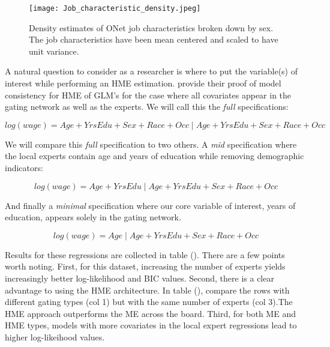 \documentclass[12pt]{article}
\begin{document}
\begin{figure}[ht]
  \texttt{[image: Job\_characteristic\_density.jpeg]}
  \caption{Density estimates of ONet job characteristics broken down by
  sex. The job characteristics have been mean centered and scaled to
  have unit variance.}
  \label{fig:JobChar_vs_sex}
\end{figure}

A natural question to consider as a researcher is where to put the variable(s)
of interest while performing an HME estimation. \cite{JiangTanner2000}
provide their proof of model consistency for HME of GLM's for the case where
all covariates appear in the gating network as well as the experts. We will
call this the \textit{full} specifications:

\begin{equation}
  log(wage) = Age + YrsEdu + Sex +  Race + Occ \; | \; Age + YrsEdu + Sex +  Race + Occ
\end{equation}

We will compare this \textit{full} specification to two others. A
\textit{mid} specification where the local experts contain age and
years of education while removing demographic indicators:

\begin{equation}
  log(wage) = Age + YrsEdu \; | \; Age + YrsEdu + Sex +  Race + Occ
\end{equation}

And finally a \textit{minimal} specification where our core variable
of interest, years of education, appears solely in the gating network.

\begin{equation}
  log(wage) = Age \; | \; Age + YrsEdu + Sex +  Race + Occ
\end{equation}

Results for these regressions are collected in table ().
There are a few points worth noting. First, for this dataset, increasing the
number of experts yields increasingly better log-likelihood and BIC values.
Second, there is a clear advantage to using the HME architecture. In table (), compare the rows with different gating types (col 1)
but with the same number of experts (col 3).The HME approach outperforms the
ME across the board. Third, for both ME and HME types, models with more
covariates in the local expert regressions lead to higher log-likeihood
values. 
\end{document}
